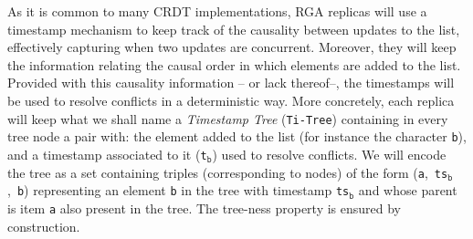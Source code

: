 As it is common to many CRDT implementations, RGA replicas will use
a timestamp mechanism to keep track of the causality between updates
to the list, effectively capturing when two updates are concurrent.
Moreover, they will keep the information relating the causal order
in which elements are added to the list.
%
Provided with this causality information -- or lack thereof--, the
timestamps will be used to resolve conflicts in a deterministic way.
%
More concretely, each replica will keep what we shall name a
\emph{Timestamp Tree} (\lstinline|Ti-Tree|) containing in every tree
node a pair with: the element added to the list (for instance the
character \lstinline|b|), and a timestamp associated to it
(\lstinline|t|$_{\mathtt{b}}$) used to resolve conflicts.
%
We will encode the tree as a set containing triples (corresponding to
nodes) of the form \mbox{(\lstinline|a|, \lstinline|ts|$_{\mathtt{b}}$, \lstinline|b|)}
representing an element \lstinline|b| in the
tree with timestamp \lstinline|ts|$_{\mathtt{b}}$ and whose parent is
item \lstinline|a| also present in the tree.
%
The tree-ness property is ensured by construction.


